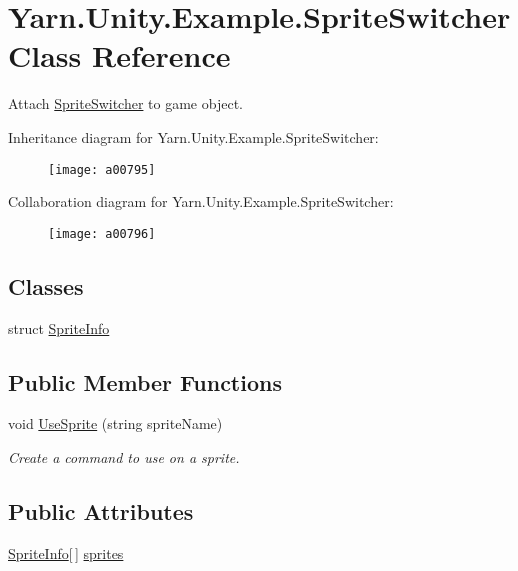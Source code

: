 \hypertarget{a00153}{\section{Yarn.\-Unity.\-Example.\-Sprite\-Switcher Class Reference}
\label{a00153}
}


Attach \hyperlink{a00153}{Sprite\-Switcher} to game object.  




Inheritance diagram for Yarn.\-Unity.\-Example.\-Sprite\-Switcher\-:
\nopagebreak
\begin{figure}[H]
\begin{center}
\leavevmode
\texttt{[image: a00795]}
\end{center}
\end{figure}


Collaboration diagram for Yarn.\-Unity.\-Example.\-Sprite\-Switcher\-:
\nopagebreak
\begin{figure}[H]
\begin{center}
\leavevmode
\texttt{[image: a00796]}
\end{center}
\end{figure}
\subsection*{Classes}
\begin{DoxyCompactItemize}
\item 
struct \hyperlink{a00153_a00364}{Sprite\-Info}
\end{DoxyCompactItemize}
\subsection*{Public Member Functions}
\begin{DoxyCompactItemize}
\item 
void \hyperlink{a00153_ac26718b713f342f3de8f3e569c5b62da}{Use\-Sprite} (string sprite\-Name)
\begin{DoxyCompactList}\small\item\em Create a command to use on a sprite. \end{DoxyCompactList}\end{DoxyCompactItemize}
\subsection*{Public Attributes}
\begin{DoxyCompactItemize}
\item 
\hyperlink{a00153_a00364}{Sprite\-Info}\mbox{[}$\,$\mbox{]} \hyperlink{a00153_a1e85d9f4f6b33ca7ae638cce2eb704aa}{sprites}
\end{DoxyCompactItemize}


